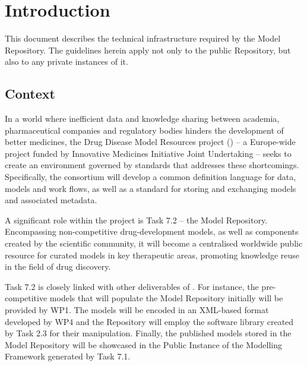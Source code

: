 \section{Introduction}
\label{introduction}
This document describes the technical infrastructure required by the \ddmore Model Repository. The guidelines herein apply not only to the public Repository, but also to any private instances of it.

\subsection{Context}
\label{context}
In a world where inefficient data and knowledge sharing between academia, pharmaceutical companies and regulatory bodies hinders the development of better medicines, the Drug Disease Model Resources project (\ddmore) -- a Europe-wide project funded by Innovative Medicines Initiative Joint Undertaking -- seeks to create an environment governed by standards that addresses these shortcomings. Specifically, the \ddmore consortium will develop a common definition language for data, models and work flows, as well as a standard for storing and exchanging \glspl{model} and associated metadata\cite{ddmore:dow}.

A significant role within the project is Task 7.2 -- the \ddmore Model Repository. Encompassing non-competitive drug-development models, as well as components created by the scientific community, it will become a centralised worldwide public resource for curated models in key therapeutic areas, promoting knowledge reuse in the field of drug discovery. 

Task 7.2 is closely linked with other deliverables of \ddmore. For instance, the pre-competitive models that will populate the Model Repository initially will be provided by WP1. The models will be encoded in an XML-based format developed by WP4 and the Repository will employ the software library created by Task 2.3 for their manipulation. Finally, the published models stored in the \ddmore Model Repository will be showcased in the Public Instance of the Modelling Framework generated by Task 7.1.

